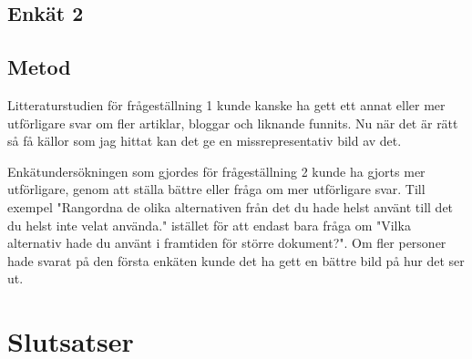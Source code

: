 \subsection{Enkät 2}


\subsection{Metod}
Litteraturstudien för frågeställning 1 kunde kanske ha gett ett annat eller mer utförligare svar om fler artiklar, bloggar och liknande funnits. Nu när det är rätt så få källor som jag hittat kan det ge en missrepresentativ bild av det.

Enkätundersökningen som gjordes för frågeställning 2 kunde ha gjorts mer utförligare, genom att ställa bättre eller fråga om mer utförligare svar. Till exempel "Rangordna de olika alternativen från det du hade helst använt till det du helst inte velat använda." istället för att endast bara fråga om "Vilka alternativ hade du använt i framtiden för större dokument?". Om fler personer hade svarat på den första enkäten kunde det ha gett en bättre bild på hur det ser ut.

\section{Slutsatser}
\label{sec:conclusions-tuhkala}




